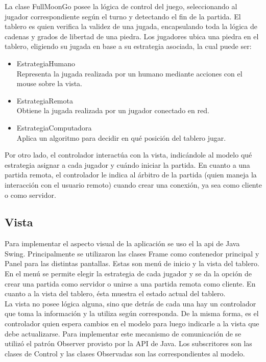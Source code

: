 \documentclass[11pt]{article}
\begin{document}
La clase FullMoonGo posee la l\'ogica de control del juego, seleccionando al jugador correspondiente seg\'un el turno y
detectando el fin de la partida. El tablero es quien verifica la validez de una jugada, encapsulando toda la l\'ogica de cadenas y grados de libertad de una piedra.
Los jugadores ubica una piedra en el tablero, eligiendo su jugada en base a su estrategia asociada, la cual puede ser:
\begin{itemize}
 \item EstrategiaHumano\\
      Representa la jugada realizada por un humano mediante acciones con el mouse sobre la vista.
 \item EstrategiaRemota\\
      Obtiene la jugada realizada por un jugador conectado en red.
 \item	EstrategiaComputadora \\
      Aplica un algoritmo para decidir en qu\'e posici\'on del tablero jugar.
\end{itemize}

Por otro lado, el controlador interact\'ua con la vista, indic\'andole al modelo qu\'e estrategia asignar a cada jugador y
cu\'ando iniciar la partida. En cuanto a una partida remota, el controlador le indica al \'arbitro de la partida (quien maneja la interacci\'on 
con el usuario remoto) cuando crear una conexi\'on, ya sea como cliente o como servidor.

\subsection{Vista}
\label{sec-4.1}


Para implementar el aspecto visual de la aplicaci\'on se uso el la api de Java Swing. Principalmente se utilizaron las clases Frame como contenedor principal y Panel para las distintas pantallas. 
Estas son men\'u de inicio y  la vista del tablero.
En el men\'u se permite elegir la estrategia de cada jugador y se da la opci\'on de crear una partida como servidor o unirse a una partida remota como cliente.
En cuanto a la vista del tablero, \'esta muestra el estado actual del tablero. \\
La vista no posee l\'ogica alguna, sino que detr\'as de cada una hay un controlador que toma la informaci\'on y la utiliza seg\'un corresponda. 
De la misma forma, es el controlador quien espera cambios en el modelo para luego indicarle a la vista que debe actualizarse. Para implementar este mecanismo de comunicaci\'on de se utiliz\'o el patr\'on Observer provisto por la API de Java. Los subscritores son las clases de Control y las clases Observadas son las correspondientes al modelo.
\end{document}
